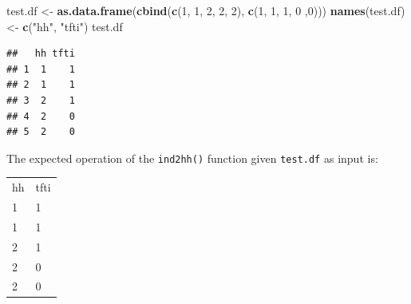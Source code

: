 \documentclass[12pt,a4paper]{book}
\newenvironment{Shaded}{\begin{snugshade}}{\end{snugshade}}
\newcommand{\DecValTok}[1]{\textcolor[rgb]{0.00,0.00,0.81}{#1}}
\newcommand{\KeywordTok}[1]{\textcolor[rgb]{0.13,0.29,0.53}{\textbf{#1}}}
\newcommand{\NormalTok}[1]{#1}
\newcommand{\StringTok}[1]{\textcolor[rgb]{0.31,0.60,0.02}{#1}}
\theoremstyle{definition}
\theoremstyle{definition}
\theoremstyle{definition}
\theoremstyle{remark}
\begin{document}
\begin{Shaded}
\begin{Highlighting}[]
\NormalTok{test.df <-}\StringTok{ }\KeywordTok{as.data.frame}\NormalTok{(}\KeywordTok{cbind}\NormalTok{(}\KeywordTok{c}\NormalTok{(}\DecValTok{1}\NormalTok{, }\DecValTok{1}\NormalTok{, }\DecValTok{2}\NormalTok{, }\DecValTok{2}\NormalTok{, }\DecValTok{2}\NormalTok{),  }\KeywordTok{c}\NormalTok{(}\DecValTok{1}\NormalTok{, }\DecValTok{1}\NormalTok{, }\DecValTok{1}\NormalTok{, }\DecValTok{0}\NormalTok{ ,}\DecValTok{0}\NormalTok{)))}
\KeywordTok{names}\NormalTok{(test.df) <-}\StringTok{ }\KeywordTok{c}\NormalTok{(}\StringTok{"hh"}\NormalTok{, }\StringTok{"tfti"}\NormalTok{)}
\NormalTok{test.df}
\end{Highlighting}
\end{Shaded}

\begin{verbatim}
##   hh tfti
## 1  1    1
## 2  1    1
## 3  2    1
## 4  2    0
## 5  2    0
\end{verbatim}

The expected operation of the \texttt{ind2hh()} function given
\texttt{test.df} as input is:

\begin{longtable}[]{@{}ll@{}}
\toprule
\endhead
\begin{minipage}[t]{0.08\columnwidth}\raggedright
hh\strut
\end{minipage} & \begin{minipage}[t]{0.14\columnwidth}\raggedright
tfti\strut
\end{minipage}\tabularnewline
\begin{minipage}[t]{0.08\columnwidth}\raggedright
1\strut
\end{minipage} & \begin{minipage}[t]{0.14\columnwidth}\raggedright
1\strut
\end{minipage}\tabularnewline
\begin{minipage}[t]{0.08\columnwidth}\raggedright
1\strut
\end{minipage} & \begin{minipage}[t]{0.14\columnwidth}\raggedright
1\strut
\end{minipage}\tabularnewline
\begin{minipage}[t]{0.08\columnwidth}\raggedright
2\strut
\end{minipage} & \begin{minipage}[t]{0.14\columnwidth}\raggedright
1\strut
\end{minipage}\tabularnewline
\begin{minipage}[t]{0.08\columnwidth}\raggedright
2\strut
\end{minipage} & \begin{minipage}[t]{0.14\columnwidth}\raggedright
0\strut
\end{minipage}\tabularnewline
\begin{minipage}[t]{0.08\columnwidth}\raggedright
2\strut
\end{minipage} & \begin{minipage}[t]{0.14\columnwidth}\raggedright
0\strut
\end{minipage}\tabularnewline
\bottomrule
\end{longtable}
\end{document}
